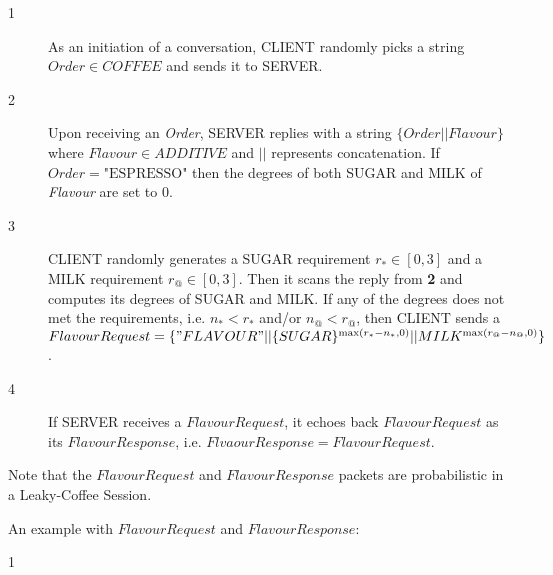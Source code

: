 \begin{description}
\item[1] As an initiation of a conversation, CLIENT randomly picks a string $Order \in COFFEE$ and sends it to SERVER.

\item[2] Upon receiving an \textit{Order}, SERVER replies with a string $\{Order || Flavour\}$ where $Flavour \in ADDITIVE$ and $||$ represents concatenation. If $Order = \text{"ESPRESSO"}$ then the degrees of both SUGAR and MILK of \textit{Flavour} are set to $0$.

\item[3] CLIENT randomly generates a SUGAR requirement $r_* \in [0, 3]$ and a MILK requirement $r_@ \in [0,3]$. Then it scans the reply from \textbf{2} and computes its degrees of SUGAR and MILK. If any of the degrees does not  met the requirements, i.e. $n_* < r_*$ and/or $n_@ < r_@$, then CLIENT sends a $ FlavourRequest = \{"FLAVOUR"||\{SUGAR\}^{\max({r_* - n_*,0})} || MILK^{\max(r_@ -  n_@, 0)} \} $.

\item[4] If SERVER receives a $FlavourRequest$, it echoes back $FlavourRequest$ as its $FlavourResponse$, i.e. $FlvaourResponse = FlavourRequest$.	
\end{description}

Note that the $FlavourRequest$ and $FlavourResponse$ packets are probabilistic in a Leaky-Coffee Session.

\begin{example} 
An example with $FlavourRequest$ and $FlavourResponse$:
\begin{description}
\item [1] 
\end{description}
\end{example}




